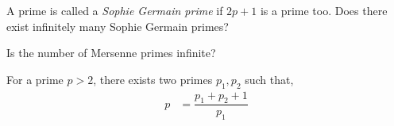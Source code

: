 \begin{conjecture}
	A prime is called a \textit{Sophie Germain prime} if $2p+1$ is a prime too. Does there exist infinitely many Sophie Germain primes?
\end{conjecture}

\begin{conjecture}
	Is the number of Mersenne primes infinite?
\end{conjecture}


\begin{conjecture}
	For a prime $p>2$, there exists two primes $p_1,p_2$ such that,
		\begin{align*}
			p & = \dfrac{p_1+p_2+1}{p_1}
		\end{align*}
\end{conjecture}
